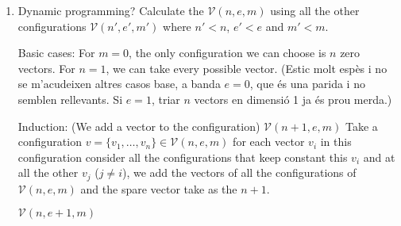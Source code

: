 \documentclass[10pt]{article}
\begin{document}
\begin{enumerate}
\item Dynamic programming? Calculate the $\mathcal{V}(n,e,m)$ using all the other configurations $\mathcal{V}(n',e',m')$ where $n'<n$, $e'<e$ and $m'<m$. 

Basic cases:
For $m=0$, the only configuration we can choose is $n$ zero vectors.
For $n=1$, we can take every possible vector.
(Estic molt esp\`es i no se m'acudeixen altres casos base, a banda $e=0$, que \'es una parida i no semblen rellevants. Si $e=1$, triar $n$ vectors en dimensi\'o 1 ja \'es prou merda.)

Induction:
(We add a vector to the configuration) $\mathcal{V}(n + 1,e,m)$
Take a configuration $v = \{v_1, \ldots, v_n\}\in \mathcal{V}(n,e,m)$ for each vector $v_i$ in this configuration consider all the configurations that keep constant this $v_i$ and at all the other $v_j$ ($j \neq i$), we add the vectors of all the configurations of $\mathcal{V}(n,e,m)$ and the spare vector take as the $n+1$.

$\mathcal{V}(n,e + 1,m)$


\end{enumerate}
\end{document}
